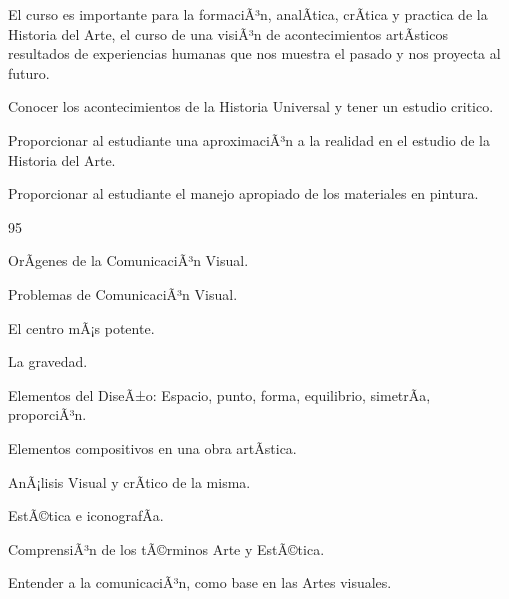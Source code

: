 \begin{syllabus}


\begin{justification}
El curso es importante para la formaciÃ³n, analÃ­tica, crÃ­tica y practica de la Historia del Arte, el curso de una visiÃ³n de acontecimientos artÃ­sticos resultados de experiencias humanas que nos muestra el pasado y nos proyecta al futuro.
\end{justification}

\begin{goals}
\item Conocer los acontecimientos de la Historia Universal y tener un estudio critico.
\item Proporcionar al estudiante una aproximaciÃ³n a la realidad en el estudio de la Historia del Arte.
\item Proporcionar al estudiante el manejo apropiado de los materiales en pintura.
\end{goals}

\begin{outcomes}
\end{outcomes}

\begin{unit}{}{}{9}{5}
\begin{topics}
	\item OrÃ­genes de la ComunicaciÃ³n Visual.
	\item Problemas de ComunicaciÃ³n Visual.
	\item El centro mÃ¡s potente.
	\item La gravedad.
	\item Elementos del DiseÃ±o: Espacio, punto, forma, equilibrio, simetrÃ­a, proporciÃ³n.
	\item Elementos compositivos en una obra artÃ­stica.
	\item AnÃ¡lisis Visual y crÃ­tico de la misma.
	\item EstÃ©tica e iconografÃ­a.
\end{topics}
\begin{unitgoals}
	\item ComprensiÃ³n de los tÃ©rminos Arte y EstÃ©tica.
	\item Entender a la comunicaciÃ³n, como base en las Artes visuales.

\end{unitgoals}
\end{unit}


\end{syllabus}
